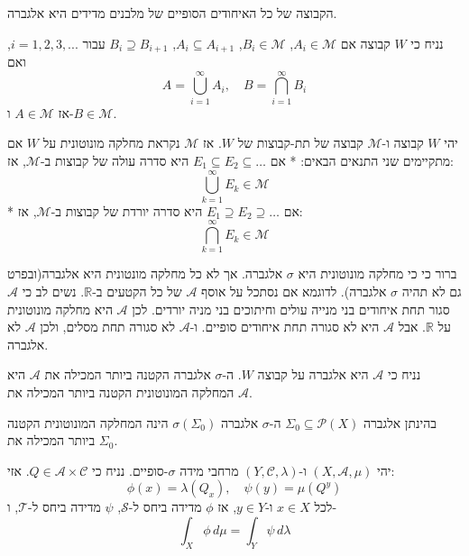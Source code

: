 \documentclass{tstextbook}
\begin{document}
\begin{proposition}
הקבוצה של כל האיחודים הסופיים של מלבנים מדידים היא אלגברה.

\end{proposition}
\begin{definition}
נניח כי \(W\) קבוצה
אם \(A_i \in \mathcal{M}\), \(B_i \in \mathcal{M}\), \(A_i \subseteq A_{i+1}\), \(B_i \supseteq B_{i+1}\) עבור \(i = 1, 2, 3, ...\), ואם
$$A = \bigcup_{i=1}^\infty A_i, \quad B = \bigcap_{i=1}^\infty B_i$$
אז \(A \in \mathcal{M}\) ו-\(B \in \mathcal{M}\).

\end{definition}
\begin{definition}
יהי \(W\) קבוצה ו-\(\mathcal{M}\) קבוצה של תת-קבוצות של \(W\). אז \(\mathcal{M}\) נקראת מחלקה מונוטונית על \(W\) אם מתקיימים שני התנאים הבאים:
*   אם \(E_1 \subseteq E_2 \subseteq \dots\) היא סדרה עולה של קבוצות ב-\(\mathcal{M}\), אז:
$$\bigcup_{k=1}^{\infty} E_k \in \mathcal{M}$$
*   אם \(E_1 \supseteq E_2 \supseteq \dots\) היא סדרה יורדת של קבוצות ב-\(\mathcal{M}\), אז:
$$\bigcap_{k=1}^{\infty} E_k \in \mathcal{M}$$

\end{definition}
\begin{remark}
ברור כי כי מחלקה מונוטונית היא \(\sigma\)  אלגברה. אך לא כל מחלקה מונטונית היא אלגברה(ובפרט גם לא תהיה \(\sigma\) אלגברה). לדוגמא אם נסתכל על אוסף \(\mathcal{A}\) של כל הקטעים ב-\(\mathbb{R}\). נשים לב כי \(\mathcal{A}\) סגור תחת איחודים בני מנייה עולים וחיתוכים בני מניה יורדים. לכן \(\mathcal{A}\) היא מחלקה מונוטונית על \(\mathbb{R}\). אבל \(\mathcal{A}\) היא לא סגורה תחת איחודים סופיים. ו-\(\mathcal{A}\) לא סגורה תחת מסלים, ולכן \(\mathcal{A}\) לא אלגברה.

\end{remark}
\begin{theorem}
נניח כי \(\mathcal{A}\) היא אלגברה על קבוצה \(W\). ה-\(\sigma\) אלגברה הקטנה ביותר המכילה את \(\mathcal{A}\) היא המחלקה המונוטונית הקטנה ביותר המכילה את \(\mathcal{A}\).

\end{theorem}
\begin{proposition}
בהינתן אלגברה \(\Sigma_{0}\subseteq\mathcal{P}(X)\) ה-\(\sigma\) אלגברה \(\sigma\left( \Sigma_{0} \right)\) הינה המחלקה המונוטונית הקטנה ביותר המכילה את \(\Sigma_{0}\).

\end{proposition}
\begin{proposition}
יהי \((X, \mathcal{A}, \mu)\) ו-\((Y, \mathcal{C}, \lambda)\) מרחבי מידה \(\sigma\)-סופיים. נניח כי \(Q \in \mathcal{A} \times \mathcal{C}\). אזי:
$$\phi(x) = \lambda(Q_x), \quad \psi(y) = \mu(Q^y) $$
לכל \(x \in X\) ו-\(y \in Y\), אז \(\phi\) מדידה ביחס ל-\(\mathcal{S}\), \(\psi\) מדידה ביחס ל-\(\mathcal{T}\), ו-
$$\int_X \phi \, d\mu = \int_Y \psi \, d\lambda$$

\end{proposition}
\end{document}
